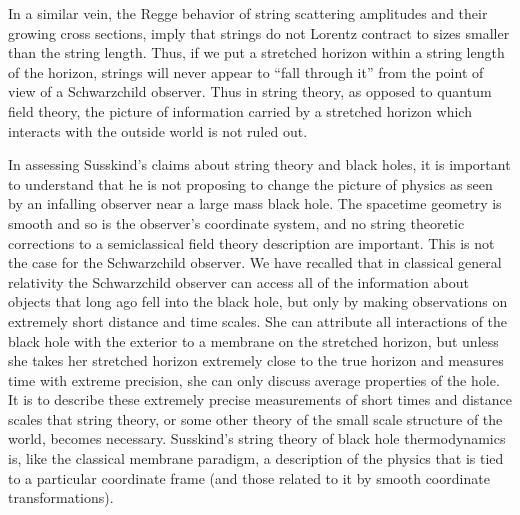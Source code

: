 In a similar vein, the Regge behavior of string scattering amplitudes and
their growing cross sections, imply that
strings do not Lorentz contract to sizes smaller than the string length.
Thus, if we put a stretched horizon
within a string length of the horizon, strings will never appear to
``fall through it'' from the point of view of a Schwarzchild
observer.  Thus in string theory, as opposed to quantum field theory, the
picture of information carried by
a stretched horizon which interacts with the outside world is not ruled out.

In assessing Susskind's claims about string theory and black holes, it is
important to understand that he is not proposing to change the picture of
physics as seen by an infalling observer near a large mass black hole.  The
spacetime geometry is smooth and so is the observer's coordinate system, and
no string theoretic
corrections to a semiclassical field theory description are important.
This is not the case for the Schwarzchild observer.  We have recalled that
in classical general relativity the Schwarzchild observer can access all of
the information
about objects that long ago fell into the black hole, but only by making
observations
on extremely short distance and time scales.  She can attribute all
interactions of
the black hole with the exterior to a membrane on the stretched horizon, but
unless she takes
her stretched horizon extremely close to the true horizon and measures time
with extreme precision, she can only discuss average properties of the hole.
It is to describe these extremely precise measurements of short times and
distance scales
that string theory, or some other theory of the small scale structure of the
world, becomes necessary.
Susskind's string theory of black hole thermodynamics is, like the classical
membrane paradigm,
a description of the physics that is tied to a particular coordinate frame
(and those related to it by
smooth coordinate transformations).

